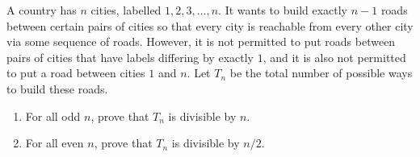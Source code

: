 A country has $n$ cities, labelled $1,2,3,\dots,n$.  It wants to build exactly $n-1$ roads between certain pairs of cities so that every city is reachable from every other city via some sequence of roads.  However, it is not permitted to put roads between pairs of cities that have labels differing by exactly $1$, and it is also not permitted to put a road between cities $1$ and $n$.  Let $T_n$ be the total number of possible ways to build these roads.
\begin{enumerate}[label=(\alph*)]
	\item For all odd $n$, prove that $T_n$ is divisible by $n$.
	\item For all even $n$, prove that $T_n$ is divisible by $n/2$.
\end{enumerate}